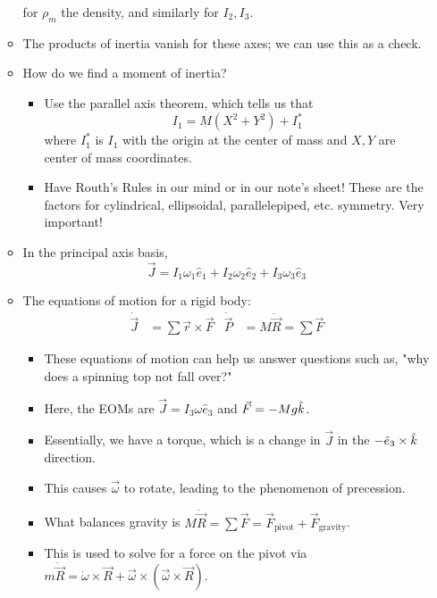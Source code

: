 \documentclass[../notes.tex]{subfiles}
\begin{document}
\begin{itemize}
\begin{itemize}
\begin{equation*}
        \end{equation*}
        for $\rho_m$ the density, and similarly for $I_2,I_3$.
        \item The products of inertia vanish for these axes; we can use this as a check.
        \item How do we find a moment of inertia?
        \begin{itemize}
            \item Use the parallel axis theorem, which tells us that
            \begin{equation*}
                I_1 = M(X^2+Y^2)+I_1^*
            \end{equation*}
            where $I_1^*$ is $I_1$ with the origin at the center of mass and $X,Y$ are center of mass coordinates.
            \item Have Routh's Rules in our mind or in our note's sheet! These are the factors for cylindrical, ellipsoidal, parallelepiped, etc. symmetry. Very important!
        \end{itemize}
        \item In the principal axis basis,
        \begin{equation*}
            \vec{J} = I_1\omega_1\hat{e}_1+I_2\omega_2\hat{e}_2+I_3\omega_3\hat{e}_3
        \end{equation*}
        \item The equations of motion for a rigid body:
        \begin{align*}
            \dot{\vec{J}} &= \sum\vec{r}\times\vec{F}&
            \dot{\vec{P}} &= M\ddot{\vec{R}} = \sum\vec{F}
        \end{align*}
        \begin{itemize}
            \item These equations of motion can help us answer questions such as, "why does a spinning top not fall over?"
            \item Here, the EOMs are $\vec{J}=I_3\omega\hat{e}_3$ and $\vec{F}=-Mg\hat{k}$.
            \item Essentially, we have a torque, which is a change in $\vec{J}$ in the $-\hat{e}_3\times\hat{k}$ direction.
            \item This causes $\vec{\omega}$ to rotate, leading to the phenomenon of precession.
            \item What balances gravity is $M\ddot{\vec{R}}=\sum\vec{F}=\vec{F}_\text{pivot}+\vec{F}_\text{gravity}$.
            \item This is used to solve for a force on the pivot via $m\ddot{\vec{R}}=\dot{\omega}\times\vec{R}+\vec{\omega}\times(\vec{\omega}\times\vec{R})$.

\end{itemize}
\end{itemize}
\end{itemize}
\end{document}
